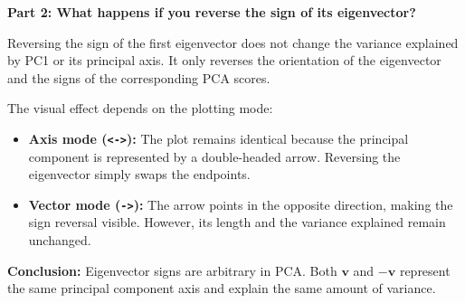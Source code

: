 \documentclass[11pt]{article}
\providecommand{\tightlist}{%
      \setlength{\itemsep}{0pt}\setlength{\parskip}{0pt}}
\begin{document}
\textbf{Part 2: What happens if you reverse the sign of its
eigenvector?}

Reversing the sign of the first eigenvector does not change the variance
explained by PC1 or its principal axis. It only reverses the orientation
of the eigenvector and the signs of the corresponding PCA scores.

The visual effect depends on the plotting mode:

\begin{itemize}
\tightlist
\item
  \textbf{Axis mode (\texttt{\textless{}-\textgreater{}}):} The plot
  remains identical because the principal component is represented by a
  double-headed arrow. Reversing the eigenvector simply swaps the
  endpoints.
\item
  \textbf{Vector mode (\texttt{-\textgreater{}}):} The arrow points in
  the opposite direction, making the sign reversal visible. However, its
  length and the variance explained remain unchanged.
\end{itemize}

\textbf{Conclusion:} Eigenvector signs are arbitrary in PCA. Both
\(\mathbf{v}\) and \(-\mathbf{v}\) represent the same principal
component axis and explain the same amount of variance.
\end{document}

